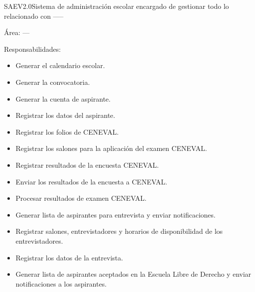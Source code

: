 \begin{Actor}{SAEV2.0}{Sistema de administración escolar encargado de gestionar todo lo relacionado con ----- }
	\item[Área:] ---
	\item[Responsabilidades:] \hspace{1pt}
	\begin{itemize}
		\item Generar el calendario escolar.
		\item Generar la convocatoria.
		\item Generar la cuenta de aspirante.
		\item Registrar los datos del aspirante.
		\item Registrar los folios de CENEVAL.
		\item Registrar los salones para la aplicación del examen CENEVAL.
		\item Registrar resultados de la encuesta CENEVAL.
		\item Enviar los resultados de la encuesta a CENEVAL.
		\item Procesar resultados de examen CENEVAL.
		\item Generar lista de aspirantes para entrevista y enviar notificaciones.
		\item Registrar salones, entrevistadores y horarios de disponibilidad de los entrevistadores.
		\item Registrar los datos de la entrevista.
		\item Generar lista de aspirantes aceptados en la Escuela Libre de Derecho y enviar notificaciones a los aspirantes.
	\end{itemize}
\end{Actor}


